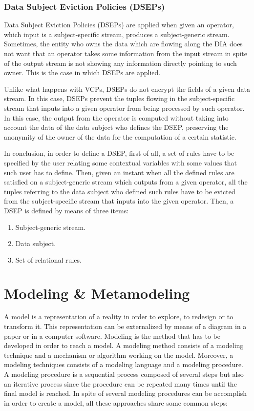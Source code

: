 \subsubsection{Data Subject Eviction Policies (DSEPs)}

Data Subject Eviction Policies (DSEPs) are applied when given an operator, which input is a subject-specific stream, produces a subject-generic stream. Sometimes, the entity who owns the data which are flowing along the DIA does not want that an operator takes some information from the input stream in spite of the output stream is not showing any information directly pointing to such owner. This is the case in which DSEPs are applied.

Unlike what happens with VCPs, DSEPs do not encrypt the fields of a given data stream. In this case, DSEPs prevent the tuples flowing in the subject-specific stream that inputs into a given operator from being processed by such operator. In this case, the output from the operator is computed without taking into account the data of the data subject who defines the DSEP, preserving the anonymity of the owner of the data for the computation of a certain statistic.

In conclusion, in order to define a DSEP, first of all, a set of rules have to be specified by the user relating some contextual variables with some values that such user has to define. Then, given an instant when all the defined rules are satisfied on a subject-generic stream which outputs from a given operator, all the tuples referring to the data subject who defined such rules have to be evicted from the subject-specific stream that inputs into the given operator. Then, a DSEP is defined by means of three items:

\begin{enumerate}

\item Subject-generic stream.
\item Data subject.
\item Set of relational rules.

\end{enumerate}

\section{Modeling \& Metamodeling}

A model is a representation of a reality in order to explore, to redesign or to transform it. This representation can be externalized by means of a diagram in a paper or in a computer software. Modeling is the method that has to be developed in order to reach a model. A modeling method consists of a modeling technique and a mechanism or algorithm working on the model. Moreover, a modeling techniques consists of a modeling language and a modeling procedure. A modeling procedure is a sequential process composed of several steps but also an iterative process since the procedure can be repeated many times until the final model is reached. In spite of several modeling procedures can be accomplish in order to create a model, all these approaches share some common steps:

